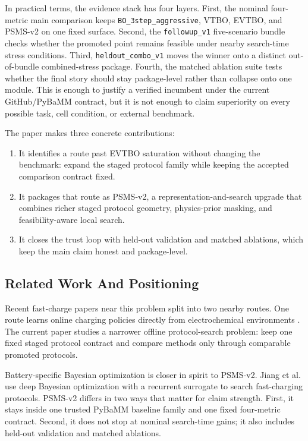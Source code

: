 \documentclass[11pt]{article}
\begin{document}
In practical terms, the evidence stack has four layers. First, the nominal four-metric main comparison keeps \texttt{BO\_3step\_aggressive}, VTBO, EVTBO, and PSMS-v2 on one fixed surface. Second, the \texttt{followup\_v1} five-scenario bundle checks whether the promoted point remains feasible under nearby search-time stress conditions. Third, \texttt{heldout\_combo\_v1} moves the winner onto a distinct out-of-bundle combined-stress package. Fourth, the matched ablation suite tests whether the final story should stay package-level rather than collapse onto one module. This is enough to justify a verified incumbent under the current GitHub/PyBaMM contract, but it is not enough to claim superiority on every possible task, cell condition, or external benchmark.

The paper makes three concrete contributions:
\begin{enumerate}
  \item It identifies a route past EVTBO saturation without changing the benchmark: expand the staged protocol family while keeping the accepted comparison contract fixed.
  \item It packages that route as PSMS-v2, a representation-and-search upgrade that combines richer staged protocol geometry, physics-prior masking, and feasibility-aware local search.
  \item It closes the trust loop with held-out validation and matched ablations, which keep the main claim honest and package-level.
\end{enumerate}

\subsection{Related Work And Positioning}

Recent fast-charge papers near this problem split into two nearby routes. One route learns online charging policies directly from electrochemical environments \cite{park2020rl,chowdhury2024safe,yuan2025lifelong}. The current paper studies a narrower offline protocol-search problem: keep one fixed staged protocol contract and compare methods only through comparable promoted protocols.

Battery-specific Bayesian optimization is closer in spirit to PSMS-v2. Jiang et al. \cite{jiang2023deepbo} use deep Bayesian optimization with a recurrent surrogate to search fast-charging protocols. PSMS-v2 differs in two ways that matter for claim strength. First, it stays inside one trusted PyBaMM baseline family and one fixed four-metric contract. Second, it does not stop at nominal search-time gains; it also includes held-out validation and matched ablations.
\end{document}
